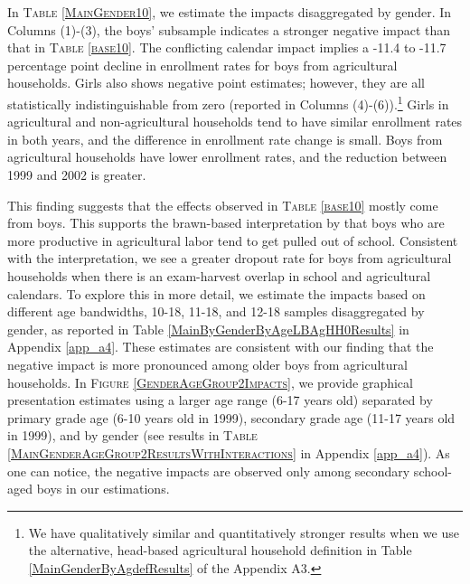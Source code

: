 \documentclass[12pt,letterpaper]{article}
\newcommand{\0}{\ensuremath{\mbox{\boldmath $0$}}}
\begin{document}
In \textsc{\small Table \ref{MainGender10}}, we estimate the impacts disaggregated by gender. In Columns (1)-(3), the boys' subsample indicates a stronger negative impact than that in \textsc{\small Table \ref{base10}}. The conflicting calendar impact implies a -11.4 to -11.7 percentage point decline in enrollment rates for boys from agricultural households. Girls also shows negative point estimates; however, they are all statistically indistinguishable from zero (reported in Columns (4)-(6)).\footnote{We have qualitatively similar and quantitatively stronger results when we use the alternative, head-based agricultural household definition in \textsf{\small Table \ref{MainGenderByAgdefResults}} of the Appendix A3. } Girls in agricultural and non-agricultural households tend to have similar enrollment rates in both years, and the difference in enrollment rate change is small. Boys from agricultural households have lower enrollment rates, and the reduction between 1999 and 2002 is greater. 

This finding suggests that the effects observed in \textsc{\small Table \ref{base10}} mostly come from boys. This supports the brawn-based interpretation by \cite{PittRosenzweigHassan2010} that boys who are more productive in agricultural labor tend to get pulled out of school. Consistent with the interpretation, we see a greater dropout rate for boys from agricultural households when there is an exam-harvest overlap in school and agricultural calendars. To explore this in more detail, we estimate the impacts based on different age bandwidths, 10-18, 11-18, and 12-18 samples disaggregated by gender, as reported in Table \ref{MainByGenderByAgeLBAgHH0Results} in Appendix \ref{app_a4}. These estimates are consistent with our finding that the negative impact is more pronounced among older boys from agricultural households. In \textsc{\small Figure \ref{GenderAgeGroup2Impacts}}, we provide graphical presentation estimates using a larger age range (6-17 years old) separated by primary grade age (6-10 years old in 1999), secondary grade age (11-17 years old in 1999), and by gender (see results in \textsc{\small Table \ref{MainGenderAgeGroup2ResultsWithInteractions}} in Appendix \ref{app_a4}). As one can notice, the negative impacts are observed only among secondary school-aged boys in our estimations. 
\end{document}
